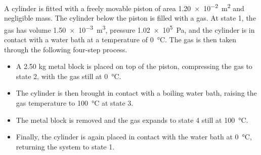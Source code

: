 \documentclass{../../../oss-ap12ibhl-print}
\begin{document}
\begin{questions}
  \question A cylinder is fitted with a freely movable piston of area
  \SI{1.20e-2}{\metre^2} and negligible mass. The cylinder below the piston is
  filled with a gas. At state 1, the gas has volume \SI{1.50e-3}{\metre^3},
  pressure \SI{1.02e5}{\pascal}, and the cylinder is in contact with a water
  bath at a temperature of \SI{0}{\celsius}. The gas is then taken through the
  following four-step process.
  \begin{itemize}
  \item A 2.50 kg metal block is placed on top of the piston, compressing the
    gas to state 2, with the gas still at \SI{0}{\celsius}.
  \item The cylinder is then brought in contact with a boiling water bath,
    raising the gas temperature to \SI{100}{\celsius} at state 3.
  \item The metal block is removed and the gas expands to state 4 still at
    \SI{100}{\celsius}.
  \item Finally, the cylinder is again placed in contact with the water bath at
    \SI{0}{\celsius}, returning the system to state 1.
  \end{itemize}
\end{questions}
\end{document}
